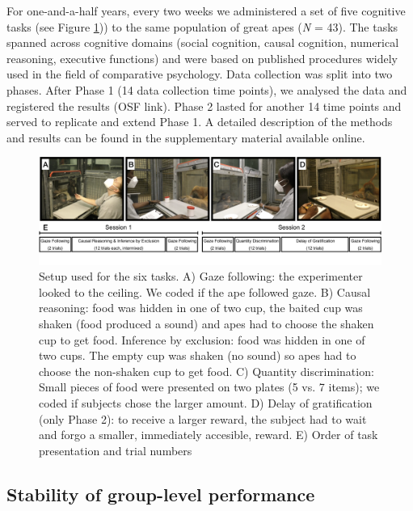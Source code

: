 \documentclass[
  man,floatsintext]{apa6}
\begin{document}
For one-and-a-half years, every two weeks we administered a set of five cognitive tasks (see Figure \ref{fig:setup})) to the same population of great apes (\emph{N} = 43). The tasks spanned across cognitive domains (social cognition, causal cognition, numerical reasoning, executive functions) and were based on published procedures widely used in the field of comparative psychology. Data collection was split into two phases. After Phase 1 (14 data collection time points), we analysed the data and registered the results (OSF link). Phase 2 lasted for another 14 time points and served to replicate and extend Phase 1. A detailed description of the methods and results can be found in the supplementary material available online.

\begin{figure}
\includegraphics[width=1\linewidth]{./figures/setup} \caption{Setup used for the six tasks. A) Gaze following: the experimenter looked to the ceiling. We coded if the ape followed gaze. B) Causal reasoning: food was hidden in one of two cup, the baited cup was shaken (food produced a sound) and apes had to choose the shaken cup to get food. Inference by exclusion: food was hidden in one of two cups. The empty cup was shaken (no sound) so apes had to choose the non-shaken cup to get food. C) Quantity discrimination: Small pieces of food were presented on two plates (5 vs. 7 items); we coded if subjects chose the larger amount. D) Delay of gratification (only Phase 2): to receive a larger reward, the subject had to wait and forgo a smaller, immediately accesible, reward. E) Order of task presentation and trial numbers}\label{fig:setup}
\end{figure}

\hypertarget{stability-of-group-level-performance}{%
\subsection{Stability of group-level performance}\label{stability-of-group-level-performance}}
\end{document}
